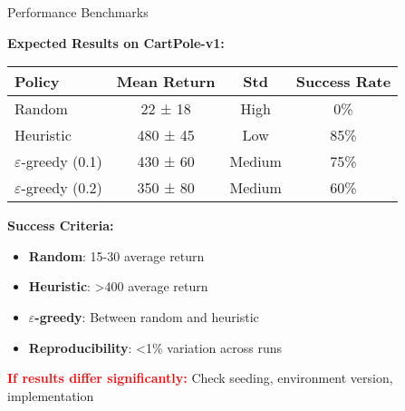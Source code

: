 \documentclass[aspectratio=169,10pt]{beamer}
\begin{document}
\begin{frame}{Performance Benchmarks}

\textbf{Expected Results on CartPole-v1:}

\begin{center}
\begin{tabular}{|l|c|c|c|}
\hline
\textbf{Policy} & \textbf{Mean Return} & \textbf{Std} & \textbf{Success Rate} \\
\hline
Random & 22 ± 18 & High & 0\% \\
Heuristic & 480 ± 45 & Low & 85\% \\
$\varepsilon$-greedy (0.1) & 430 ± 60 & Medium & 75\% \\
$\varepsilon$-greedy (0.2) & 350 ± 80 & Medium & 60\% \\
\hline
\end{tabular}
\end{center}

\vfill

\textbf{Success Criteria:}
\begin{itemize}
    \item \textbf{Random}: 15-30 average return
    \item \textbf{Heuristic}: >400 average return  
    \item \textbf{$\varepsilon$-greedy}: Between random and heuristic
    \item \textbf{Reproducibility}: <1\% variation across runs
\end{itemize}

\vfill

\textcolor{red}{\textbf{If results differ significantly:}} Check seeding, environment version, implementation

\end{frame}
\end{document}
